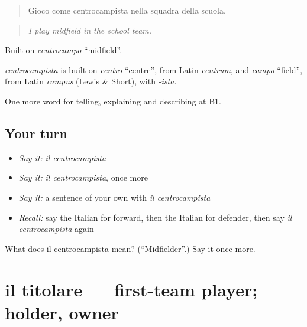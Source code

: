 \begin{quote}
Gioco come centrocampista nella squadra della scuola.
\end{quote}

\begin{quote}
\emph{I play midfield in the school team.}
\end{quote}

Built on \emph{centrocampo} \textquotedblleft{}midfield\textquotedblright{}.

\begin{cousinweb}
\emph{centrocampista} is built on \emph{centro} \textquotedblleft{}centre\textquotedblright{}, from Latin \emph{centrum}, and \emph{campo} \textquotedblleft{}field\textquotedblright{}, from Latin \emph{campus} (Lewis \& Short), with \emph{-ista}.
\end{cousinweb}

\begin{grammarlens}[title={What you've built}]
One more word for telling, explaining and describing at B1.
\end{grammarlens}

\subsection*{Your turn}
\begin{itemize}
\raggedright
  \item \emph{Say it:} \emph{il centrocampista}
  \item \emph{Say it:} \emph{il centrocampista}, once more
  \item \emph{Say it:} a sentence of your own with \emph{il centrocampista}
  \item \emph{Recall:} say the Italian for forward, then the Italian for defender, then say \emph{il centrocampista} again
\end{itemize}

\begin{tcolorbox}[breakable,colback=teal!4,colframe=teal!35!black,title={Before you move on}]
What does il centrocampista mean? (\textquotedblleft{}Midfielder\textquotedblright{}.) Say it once more.
\end{tcolorbox}
\section[il titolare]{il titolare — first-team player; holder, owner}

\label{lesson:IT-C510-titolare}



